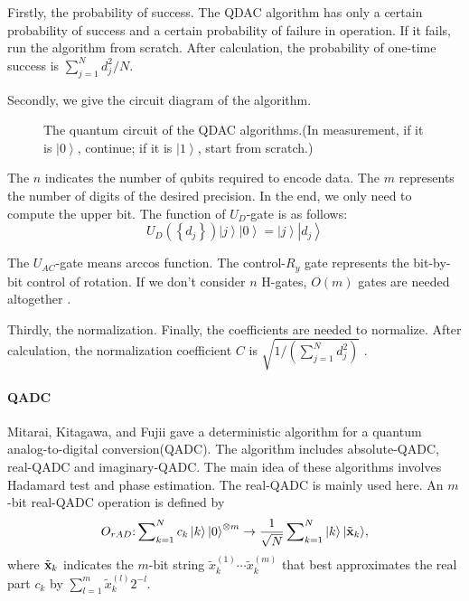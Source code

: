 \documentclass[%
 reprint,
 amsmath,amssymb,
pra,
]{revtex4-1}
\begin{document}
Firstly, the probability of success. The QDAC algorithm has only a certain probability of success and a certain probability of failure in operation. If it fails, run the algorithm from scratch. After calculation, the probability of one-time success is $\sum\nolimits_{j = 1}^N {d_j^2/N} $\cite{mitarai_quantum_2019}.

Secondly, we give the circuit diagram of the algorithm.

\begin{figure}[htbp]
  \caption{The quantum circuit of the QDAC algorithms.(In measurement, if it is $\left| 0 \right\rangle $, continue; if it is $\left| 1 \right\rangle $, start from scratch.)}
 \label{QDAC_qcir}
\end{figure}

The $n$ indicates the number of qubits required to encode data. The $m$ represents the number of digits of the desired precision. In the end, we only need to compute the upper bit. The function of ${U_D}$-gate is as follows:
\[{U_D}\left( {\left\{ {{d_j}} \right\}} \right)\left| j \right\rangle \left| 0 \right\rangle  = \left| j \right\rangle \left| {{d_j}} \right\rangle \]

The ${U_{AC}}$-gate means arccos function. The control-${R_y}$ gate represents the bit-by-bit control of rotation. If we don't consider $n$ H-gates, $O(m)$ gates are needed altogether \cite{mitarai_quantum_2019}.

Thirdly, the normalization. Finally, the coefficients are needed to normalize. After calculation, the normalization coefficient $C$ is $\sqrt {1/\left( {\sum\nolimits_{j = 1}^N {d_j^2} } \right)} $ \cite{mitarai_quantum_2019}.


\paragraph{QADC}

Mitarai, Kitagawa, and Fujii \cite{mitarai_quantum_2019} gave a deterministic algorithm for a quantum analog-to-digital conversion(QADC).
The algorithm includes absolute-QADC, real-QADC and imaginary-QADC.
The main idea of these algorithms involves Hadamard test and phase estimation. The real-QADC is mainly used here. An $m$-bit real-QADC operation is defined by 
$$
{O_{rAD}}{\rm{:}}\sum\nolimits_{k = 1}^N {{c_k}\left| k \right\rangle {{\left| 0 \right\rangle }^{ \otimes m}}}  \to \frac{1}{{\sqrt N }}\sum\nolimits_{k = 1}^N {\left| k \right\rangle \left| {{{\tilde{\textbf x} }_k}} \right\rangle } ,
$$
where ${\tilde {\textbf x}_k}$ indicates the $m$-bit string $\tilde x_k^{\left( 1 \right)} \cdots \tilde x_k^{\left( m \right)}$ that best approximates the real part ${c_k}$ by $\sum\nolimits_{l = 1}^m {\tilde x_k^{\left( l \right)}{2^{ - l}}} $.
\end{document}
